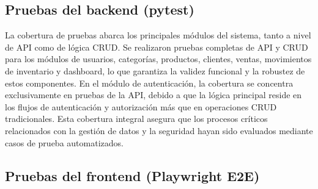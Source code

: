 \subsection{Pruebas del backend (pytest)}\label{pruebas-del-backend-pytest}

\begin{Shaded}
\begin{Highlighting}[]



  

\KeywordTok{\&\&} 
\end{Highlighting}
\end{Shaded}

La cobertura de pruebas abarca los principales módulos del sistema, tanto a nivel de API como de lógica CRUD. Se realizaron pruebas completas de API y CRUD para los módulos de usuarios, categorías, productos, clientes, ventas, movimientos de inventario y dashboard, lo que garantiza la validez funcional y la robustez de estos componentes. En el módulo de autenticación, la cobertura se concentra exclusivamente en pruebas de la API, debido a que la lógica principal reside en los flujos de autenticación y autorización más que en operaciones CRUD tradicionales. Esta cobertura integral asegura que los procesos críticos relacionados con la gestión de datos y la seguridad hayan sido evaluados mediante casos de prueba automatizados.

\subsection{Pruebas del frontend (Playwright E2E)}\label{pruebas-del-frontend-playwright-e2e}


